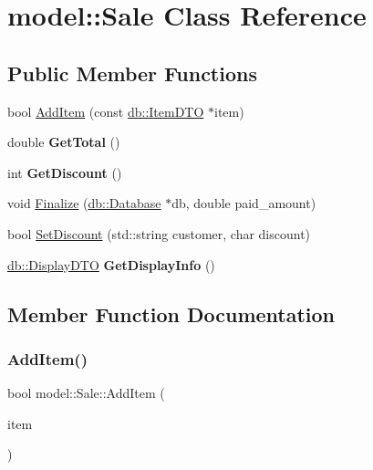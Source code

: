 \hypertarget{classmodel_1_1Sale}{}\section{model\+:\+:Sale Class Reference}
\label{classmodel_1_1Sale}
\subsection*{Public Member Functions}
\begin{DoxyCompactItemize}
\item 
bool \mbox{\hyperlink{classmodel_1_1Sale_a5c6b5c51018129dc8ddc9527781be80f}{Add\+Item}} (const \mbox{\hyperlink{classdb_1_1ItemDTO}{db\+::\+Item\+D\+TO}} $\ast$item)
\item 
\mbox{\label{classmodel_1_1Sale_a3d86becb1a92326a6466176dd008a48f}} 
double {\bfseries Get\+Total} ()
\item 
\mbox{\label{classmodel_1_1Sale_ae6caffa9a13aa31b4f8eb6883b83d662}} 
int {\bfseries Get\+Discount} ()
\item 
void \mbox{\hyperlink{classmodel_1_1Sale_a092d73ac058910164043c5d2a4c27bf6}{Finalize}} (\mbox{\hyperlink{classdb_1_1Database}{db\+::\+Database}} $\ast$db, double paid\+\_\+amount)
\item 
bool \mbox{\hyperlink{classmodel_1_1Sale_adf3d95e3f8ec65f7c7c707e982dd3169}{Set\+Discount}} (std\+::string customer, char discount)
\item 
\mbox{\label{classmodel_1_1Sale_a0ddbf2f94470ae590130e8c60e8f32b7}} 
\mbox{\hyperlink{classdb_1_1DisplayDTO}{db\+::\+Display\+D\+TO}} {\bfseries Get\+Display\+Info} ()
\end{DoxyCompactItemize}


\subsection{Member Function Documentation}
\mbox{\label{classmodel_1_1Sale_a5c6b5c51018129dc8ddc9527781be80f}} 
\subsubsection{\texorpdfstring{Add\+Item()}{AddItem()}}
{\footnotesize\ttfamily bool model\+::\+Sale\+::\+Add\+Item (\begin{DoxyParamCaption}\item[{const \mbox{\hyperlink{classdb_1_1ItemDTO}{db\+::\+Item\+D\+TO}} $\ast$}]{item }\end{DoxyParamCaption})}

